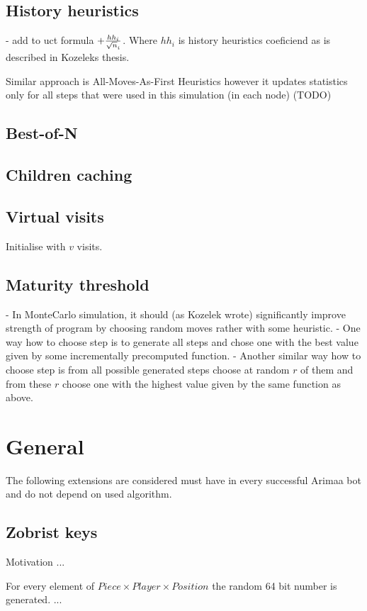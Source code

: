 \subsection{History heuristics}
- add to uct formula $+ {hh_i \over \sqrt n_i}$. Where $hh_i$ is history
heuristics coeficiend as is described in Kozeleks thesis\cite{KOZELEK}.

Similar approach is All-Moves-As-First Heuristics however it updates statistics only for all steps that were used in this simulation (in each node) (TODO)

\subsection{Best-of-N}
\subsection{Children caching}
\subsection{Virtual visits}
Initialise with $v$ visits.
\subsection{Maturity threshold}

- In MonteCarlo simulation, it should (as Kozelek wrote) significantly improve
  strength of program by choosing random moves rather with some heuristic.
	- One way how to choose step is to generate all steps and chose one with
	  the best value given by some incrementally precomputed function.
	- Another similar way how to choose step is from all possible generated
	  steps choose at random $r$ of them and from these $r$ choose one with the
	  highest value given by the same function as above.

\section{General}
The following extensions are considered must have in every successful Arimaa
bot and do not depend on used algorithm.

	\subsection{Zobrist keys}
	Motivation ...

	For every element of $Piece\times Player\times Position$ the random 64 bit
	number is generated. ...


